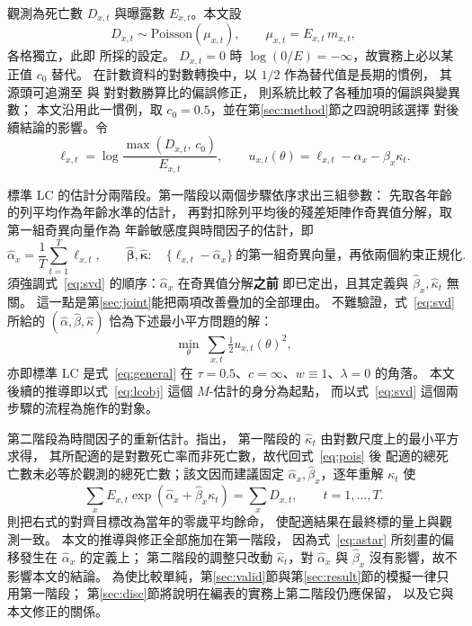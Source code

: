 \documentclass[UTF8, fontset=macnew, a4paper, 12pt]{ctexart}
\begin{document}
觀測為死亡數 $D_{x,t}$ 與曝露數 $E_{x,t}$。本文設
\begin{equation}\label{eq:pois}
D_{x,t}\sim\text{Poisson}(\mu_{x,t}),\qquad \mu_{x,t}=E_{x,t}\,m_{x,t},
\end{equation}
各格獨立，此即 \citet{brouhns2002}所採的設定。
$D_{x,t}=0$ 時 $\log(0/E)=-\infty$，故實務上必以某正值 $c_0$ 替代。
在計數資料的對數轉換中，以 $1/2$ 作為替代值是長期的慣例，
其源頭可追溯至 \citet{haldane1956}與 \citet{anscombe1956}對對數勝算比的偏誤修正，
\citet{gart1967}則系統比較了各種加項的偏誤與變異數；
本文沿用此一慣例，取 $c_0=0.5$，並在第\ref{sec:method}節之四說明該選擇
對後續結論的影響。令
\begin{equation}\label{eq:ell}
\ell_{x,t}=\log\frac{\max(D_{x,t},\,c_0)}{E_{x,t}},\qquad
u_{x,t}(\theta)=\ell_{x,t}-\alpha_x-\beta_x\kappa_t .
\end{equation}

標準 LC 的估計分兩階段。第一階段以兩個步驟依序求出三組參數：
先取各年齡的列平均作為年齡水準的估計，
再對扣除列平均後的殘差矩陣作奇異值分解，取第一組奇異向量作為
年齡敏感度與時間因子的估計，即
\begin{equation}\label{eq:svd}
\hat\alpha_x=\frac1T\sum_{t=1}^{T}\ell_{x,t},\qquad
\hat{\boldsymbol\beta},\hat{\boldsymbol\kappa}:\quad
\{\ell_{x,t}-\hat\alpha_x\}\ \text{的第一組奇異向量，再依兩個約束正規化} .
\end{equation}
須強調式~\eqref{eq:svd} 的順序：$\hat\alpha_x$ 在奇異值分解\textbf{之前}
即已定出，且其定義與 $\hat\beta_x,\hat\kappa_t$ 無關。
這一點是第\ref{sec:joint}能把兩項改善疊加的全部理由。
不難驗證，式~\eqref{eq:svd} 所給的 $(\hat\alpha,\hat\beta,\hat\kappa)$
恰為下述最小平方問題的解：
\begin{equation}\label{eq:lcobj}
\min_{\theta}\ \sum_{x,t}\tfrac12 u_{x,t}(\theta)^2 ,
\end{equation}
亦即標準 LC 是式~\eqref{eq:general} 在
$\tau=0.5$、$c=\infty$、$w\equiv1$、$\lambda=0$ 的角落。
本文後續的推導即以式~\eqref{eq:lcobj} 這個 $M$-估計的身分為起點，
而以式~\eqref{eq:svd} 這個兩步驟的流程為施作的對象。

第二階段為時間因子的重新估計。\citet{lee1992}指出，
第一階段的 $\hat\kappa_t$ 由對數尺度上的最小平方求得，
其所配適的是對數死亡率而非死亡數，故代回式~\eqref{eq:pois} 後
配適的總死亡數未必等於觀測的總死亡數；該文因而建議固定
$\hat\alpha_x,\hat\beta_x$，逐年重解 $\kappa_t$ 使
\begin{equation}\label{eq:stage2}
\sum_{x}E_{x,t}\exp(\hat\alpha_x+\hat\beta_x\kappa_t)=\sum_x D_{x,t},
\qquad t=1,\dots,T .
\end{equation}
\citet{leemiller2001}則把右式的對齊目標改為當年的零歲平均餘命，
使配適結果在最終標的量上與觀測一致。
本文的推導與修正全部施加在第一階段，
因為式~\eqref{eq:astar} 所刻畫的偏移發生在 $\hat\alpha_x$ 的定義上；
第二階段的調整只改動 $\hat\kappa_t$，對 $\hat\alpha_x$ 與 $\hat\beta_x$
沒有影響，故不影響本文的結論。
為使比較單純，第\ref{sec:valid}節與第\ref{sec:result}節的模擬一律只用第一階段；
第\ref{sec:disc}節將說明在編表的實務上第二階段仍應保留，
以及它與本文修正的關係。
\end{document}
